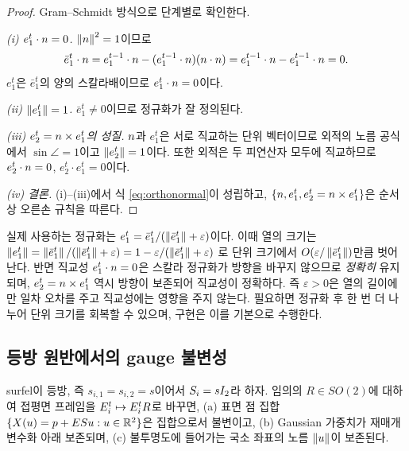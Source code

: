 \begin{proof}
Gram--Schmidt 방식으로 단계별로 확인한다.

\emph{(i) $e^t_1\cdot n=0$.} $\left\lVert n \right\rVert^2=1$이므로
\[
  \bar e^t_1\cdot n
  = e^{t-1}_1\cdot n - (e^{t-1}_1\cdot n)(n\cdot n)
  = e^{t-1}_1\cdot n - e^{t-1}_1\cdot n = 0.
\]
$e^t_1$은 $\bar e^t_1$의 양의 스칼라배이므로 $e^t_1\cdot n=0$이다.

\emph{(ii) $\left\lVert e^t_1 \right\rVert=1$.} $\bar e^t_1\ne0$이므로 정규화가 잘 정의된다.

\emph{(iii) $e^t_2 = n\times e^t_1$의 성질.} $n$과 $e^t_1$은 서로 직교하는 단위
벡터이므로 외적의 노름 공식에서 $\sin\angle=1$이고 $\left\lVert e^t_2 \right\rVert=1$이다. 또한 외적은
두 피연산자 모두에 직교하므로 $e^t_2\cdot n=0$, $e^t_2\cdot e^t_1=0$이다.

\emph{(iv) 결론.} (i)--(iii)에서 식 \eqref{eq:orthonormal}이 성립하고,
$\{n,e^t_1,e^t_2=n\times e^t_1\}$은 순서상 오른손 규칙을 따른다.
\end{proof}

\begin{remark}[$\varepsilon>0$의 편차]
실제 사용하는 정규화는 $e^t_1 = \bar e^t_1/(\left\lVert \bar e^t_1 \right\rVert+\varepsilon)$이다. 이때
열의 크기는
$\left\lVert e^t_1 \right\rVert = \left\lVert \bar e^t_1 \right\rVert/(\left\lVert \bar e^t_1 \right\rVert+\varepsilon) = 1 - \varepsilon/(\left\lVert \bar e^t_1 \right\rVert+\varepsilon)$
로 단위 크기에서 $O(\varepsilon/\left\lVert \bar e^t_1 \right\rVert)$만큼 벗어난다. 반면 직교성
$e^t_1\cdot n=0$은 스칼라 정규화가 방향을 바꾸지 않으므로 \emph{정확히} 유지되며,
$e^t_2=n\times e^t_1$ 역시 방향이 보존되어 직교성이 정확하다. 즉 $\varepsilon>0$은
열의 길이에만 일차 오차를 주고 직교성에는 영향을 주지 않는다. 필요하면 정규화 후 한
번 더 나누어 단위 크기를 회복할 수 있으며, 구현은 이를 기본으로 수행한다.
\end{remark}

\subsection{등방 원반에서의 gauge 불변성}

\begin{proposition}
\label{prop:gauge}
surfel이 등방, 즉 $s_{i,1}=s_{i,2}=s$이어서 $S_i = s I_2$라 하자. 임의의
$R\in SO(2)$에 대하여 접평면 프레임을 $E^t_i \mapsto E^t_i R$로 바꾸면,
(a) 표면 점 집합 $\{X(u) = p+ES u : u\in\mathbb{R}^2\}$은 집합으로서
불변이고, (b) Gaussian 가중치가 재매개변수화 아래 보존되며, (c) 불투명도에 들어가는
국소 좌표의 노름 $\left\lVert u \right\rVert$이 보존된다.
\end{proposition}

